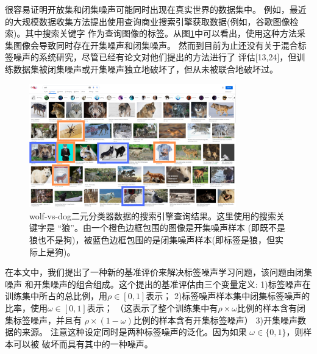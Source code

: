 \documentclass[11pt]{article}
\begin{document}
很容易证明开放集和闭集噪声可能同时出现在真实世界的数据集中。
例如，最近的大规模数据收集方法提出使用查询商业搜索引擎获取数据(例如，谷歌图像检索)。其中搜索关键字
作为查询图像的标签。从图\ref{fig1}中可以看出，使用这种方法采集图像会导致同时存在开集噪声和闭集噪声。
然而到目前为止还没有关于混合标签噪声的系统研究，尽管已经有论文对他们提出的方法进行了
评估[13,24]，但训练数据集被闭集噪声或开集噪声独立地破坏了，但从未被联合地破坏过。

\begin{figure}[h]
    \centering
    \includegraphics[width=0.8\textwidth]{images/wolfsearch.png}
    \caption{wolf-vs-dog二元分类器数据的搜索引擎查询结果。这里使用的搜索关键字是 “狼”。由一个橙色边框包围的图像是开集噪声样本 (即既不是狼也不是狗)，被蓝色边框包围的是闭集噪声样本(即标签是狼，但实际上是狗)。}
    \label{fig1}
\end{figure}

在本文中，我们提出了一种新的基准评价来解决标签噪声学习问题，该问题由闭集噪声
和开集噪声的组合组成。这个提出的基准评估由三个变量定义:
1)标签噪声在训练集中所占的总比例，用$\rho \in [0,1]$表示；
2)标签噪声样本集中闭集标签噪声的比率，使用$\omega \in [0,1]$表示；
（这表示了整个训练集中有$\rho \times \omega $比例的样本含有闭集标签噪声，并且有
$\rho \times (1 - \omega) $比例的样本含有开集标签噪声）
3)开集噪声数据的来源。
注意这种设定同时是两种标签噪声的泛化。因为如果 $\omega \in \{0,1\}$，则样本可以被
破坏而具有其中的一种噪声。
\end{document}
